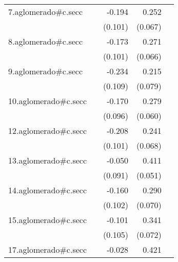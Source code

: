 {\begin{longtable}{l*{4}{D{.}{.}{-1}}}
\addlinespace
7.aglomerado#c.secc&                     &      -0.194         &       0.252\sym{***}&                     \\
            &                     &     (0.101)         &     (0.067)         &                     \\
\addlinespace
8.aglomerado#c.secc&                     &      -0.173         &       0.271\sym{***}&                     \\
            &                     &     (0.101)         &     (0.066)         &                     \\
\addlinespace
9.aglomerado#c.secc&                     &      -0.234\sym{*}  &       0.215\sym{**} &                     \\
            &                     &     (0.109)         &     (0.079)         &                     \\
\addlinespace
10.aglomerado#c.secc&                     &      -0.170         &       0.279\sym{***}&                     \\
            &                     &     (0.096)         &     (0.060)         &                     \\
\addlinespace
12.aglomerado#c.secc&                     &      -0.208\sym{*}  &       0.241\sym{***}&                     \\
            &                     &     (0.101)         &     (0.068)         &                     \\
\addlinespace
13.aglomerado#c.secc&                     &      -0.050         &       0.411\sym{***}&                     \\
            &                     &     (0.091)         &     (0.051)         &                     \\
\addlinespace
14.aglomerado#c.secc&                     &      -0.160         &       0.290\sym{***}&                     \\
            &                     &     (0.102)         &     (0.070)         &                     \\
\addlinespace
15.aglomerado#c.secc&                     &      -0.101         &       0.341\sym{***}&                     \\
            &                     &     (0.105)         &     (0.072)         &                     \\
\addlinespace
17.aglomerado#c.secc&                     &      -0.028         &       0.421\sym{***}&                     \\

\end{longtable}}
